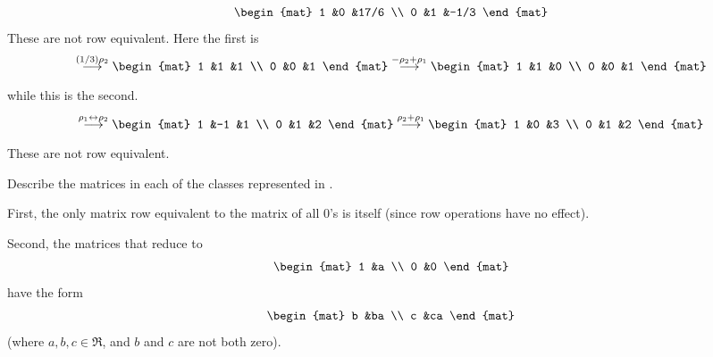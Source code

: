 \begin{exercises}
\begin{answer}
\begin{exparts}
\begin{equation*}
\begin{mat}
              1  &0  &17/6 \\
              0  &1  &-1/3
            \end{mat}
          \end{equation*}
          These are not row equivalent.
        \partsitem Here the first is
          \begin{equation*}
            \grstep{(1/3)\rho_2}
            \begin{mat}
              1  &1  &1  \\
              0  &0  &1
            \end{mat}
            \grstep{-\rho_2+\rho_1}
            \begin{mat}
              1  &1  &0  \\
              0  &0  &1
            \end{mat}
          \end{equation*}
          while this is the second.
          \begin{equation*}
            \grstep{\rho_1\leftrightarrow\rho_2}
            \begin{mat}
              1  &-1 &1  \\
              0  &1  &2
            \end{mat}
            \grstep{\rho_2+\rho_1}
            \begin{mat}
              1  &0  &3  \\
              0  &1  &2
            \end{mat}
          \end{equation*}
          These are not row equivalent.
       \end{exparts}  
     \end{answer}
  \item 
     Describe the matrices in each of the classes represented in
     .
     \begin{answer}
       First, the only matrix row equivalent to the matrix of all
       \( 0 \)'s is itself (since row operations have no effect).

       Second, the matrices that reduce to 
       \begin{equation*}
         \begin{mat}
           1  &a  \\
           0  &0
         \end{mat}
       \end{equation*}
       have the form
       \begin{equation*}
         \begin{mat}
           b  &ba \\
           c  &ca
         \end{mat}
       \end{equation*}
       (where \( a,b,c\in\Re \), and \(b\) and \(c\) are not both zero).  


\end{answer}
\end{exercises}
